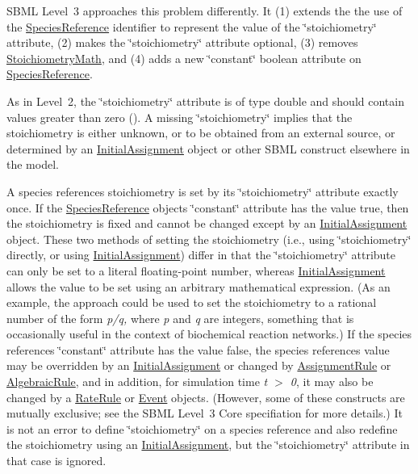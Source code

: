 S\+B\+ML Level~3 approaches this problem differently. It (1) extends the the use of the \hyperlink{class_species_reference}{Species\+Reference} identifier to represent the value of the \char`\"{}stoichiometry\char`\"{} attribute, (2) makes the \char`\"{}stoichiometry\char`\"{} attribute optional, (3) removes \hyperlink{class_stoichiometry_math}{Stoichiometry\+Math}, and (4) adds a new \char`\"{}constant\char`\"{} boolean attribute on \hyperlink{class_species_reference}{Species\+Reference}.

As in Level~2, the \char`\"{}stoichiometry\char`\"{} attribute is of type {\ttfamily double} and should contain values greater than zero ({}). A missing \char`\"{}stoichiometry\char`\"{} implies that the stoichiometry is either unknown, or to be obtained from an external source, or determined by an \hyperlink{class_initial_assignment}{Initial\+Assignment} object or other S\+B\+ML construct elsewhere in the model.

A species reference\textquotesingle{}s stoichiometry is set by its \char`\"{}stoichiometry\char`\"{} attribute exactly once. If the \hyperlink{class_species_reference}{Species\+Reference} object\textquotesingle{}s \char`\"{}constant\char`\"{} attribute has the value {\ttfamily true}, then the stoichiometry is fixed and cannot be changed except by an \hyperlink{class_initial_assignment}{Initial\+Assignment} object. These two methods of setting the stoichiometry (i.\+e., using \char`\"{}stoichiometry\char`\"{} directly, or using \hyperlink{class_initial_assignment}{Initial\+Assignment}) differ in that the \char`\"{}stoichiometry\char`\"{} attribute can only be set to a literal floating-\/point number, whereas \hyperlink{class_initial_assignment}{Initial\+Assignment} allows the value to be set using an arbitrary mathematical expression. (As an example, the approach could be used to set the stoichiometry to a rational number of the form {\itshape p/{\itshape q},} where {\itshape p} and {\itshape q} are integers, something that is occasionally useful in the context of biochemical reaction networks.) If the species reference\textquotesingle{}s \char`\"{}constant\char`\"{} attribute has the value {\ttfamily false}, the species reference\textquotesingle{}s value may be overridden by an \hyperlink{class_initial_assignment}{Initial\+Assignment} or changed by \hyperlink{class_assignment_rule}{Assignment\+Rule} or \hyperlink{class_algebraic_rule}{Algebraic\+Rule}, and in addition, for simulation time {\itshape t $>$ 0}, it may also be changed by a \hyperlink{class_rate_rule}{Rate\+Rule} or \hyperlink{class_event}{Event} objects. (However, some of these constructs are mutually exclusive; see the S\+B\+ML Level~3 Core specifiation for more details.) It is not an error to define \char`\"{}stoichiometry\char`\"{} on a species reference and also redefine the stoichiometry using an \hyperlink{class_initial_assignment}{Initial\+Assignment}, but the \char`\"{}stoichiometry\char`\"{} attribute in that case is ignored.

